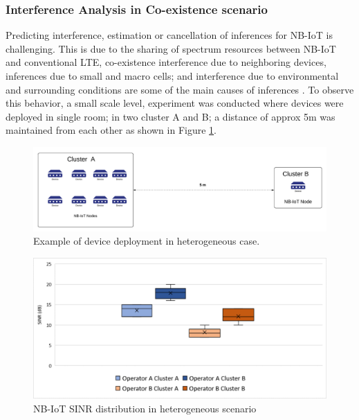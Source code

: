 \documentclass[12pt]{article}
\begin{document}
\newpage \subsubsection{Interference Analysis in Co-existence scenario} \label{interferenceExp}
Predicting interference, estimation or cancellation of inferences for NB-IoT is challenging. This is due to the sharing of spectrum resources between NB-IoT and conventional LTE, co-existence interference due to neighboring devices, inferences due to small and macro cells; and interference due to environmental and surrounding conditions are some of the main causes of inferences \cite{mwakwata2019narrowband}. To observe this behavior, a small scale level, experiment was conducted where devices were deployed in single room; in two cluster A and B; a distance of approx 5m was maintained from each other as shown in Figure \ref{fig:Example of device deployment in heterogeneous case}.

\begin{figure}[h!]
    \centering
    \includegraphics[width=0.8\linewidth]{Images/hetrogenousCase.pdf}
    \caption{Example of device deployment in heterogeneous case.}
    \label{fig:Example of device deployment in heterogeneous case}
\end{figure}
\begin{figure}[h]
    \centering
    \includegraphics[width=.8\linewidth]{Images/SINRBoxplot.pdf}
    \caption{NB-IoT SINR distribution in heterogeneous scenario}
    \label{fig:SINR distribution}
\end{figure}
\end{document}
